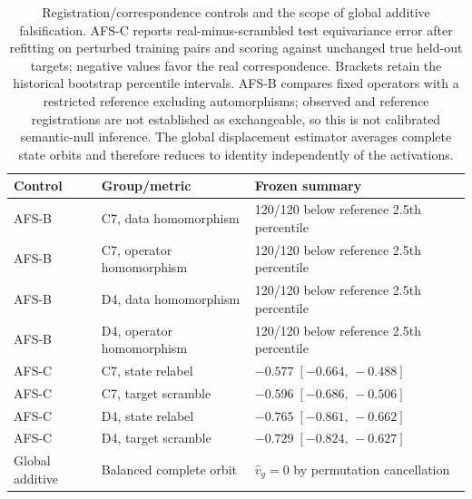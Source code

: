 \begin{table}[t]
\centering
\small
\begin{tabular}{lll}
\toprule
Control & Group/metric & Frozen summary \\
\midrule
AFS-B & C7, data homomorphism & 120/120 below reference 2.5th percentile \\
AFS-B & C7, operator homomorphism & 120/120 below reference 2.5th percentile \\
AFS-B & D4, data homomorphism & 120/120 below reference 2.5th percentile \\
AFS-B & D4, operator homomorphism & 120/120 below reference 2.5th percentile \\
AFS-C & C7, state relabel & $-0.577\;[-0.664,\,-0.488]$ \\
AFS-C & C7, target scramble & $-0.596\;[-0.686,\,-0.506]$ \\
AFS-C & D4, state relabel & $-0.765\;[-0.861,\,-0.662]$ \\
AFS-C & D4, target scramble & $-0.729\;[-0.824,\,-0.627]$ \\
\midrule
Global additive & Balanced complete orbit & $\widehat v_g=0$ by permutation cancellation \\
\bottomrule
\end{tabular}
\caption{Registration/correspondence controls and the scope of global additive falsification. AFS-C reports real-minus-scrambled test equivariance error after refitting on perturbed training pairs and scoring against unchanged true held-out targets; negative values favor the real correspondence. Brackets retain the historical bootstrap percentile intervals. AFS-B compares fixed operators with a restricted reference excluding automorphisms; observed and reference registrations are not established as exchangeable, so this is not calibrated semantic-null inference. The global displacement estimator averages complete state orbits and therefore reduces to identity independently of the activations.}
\label{tab:diagnostic-controls}
\end{table}
